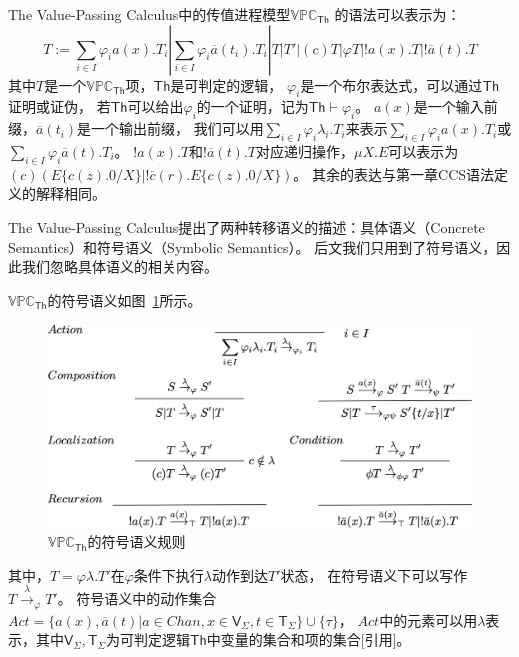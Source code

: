The Value-Passing Calculus中的传值进程模型$\mathbb{VPC}_{\mathsf{Th}}$
的语法可以表示为：
\begin{equation}\label{eq:vpc}
   T:=\sum_{i\in I}\varphi_i a(x).T_i|\sum_{i\in I}\varphi_i\overline{a}(t_i).T_i|T|T'|(c)T|\varphi T|!a(x).T|!\overline{a}(t).T
\end{equation}
其中$T$是一个$\mathbb{VPC}_{\mathsf{Th}}$项，$\mathsf{Th}$是可判定的逻辑，
$\varphi_i$是一个布尔表达式，可以通过$\mathsf{Th}$证明或证伪，
若$\mathsf{Th}$可以给出$\varphi_i$的一个证明，记为$\mathsf{Th}\vdash \varphi_i$。
$a(x)$是一个输入前缀，$\overline{a}(t_i)$是一个输出前缀，
我们可以用$\sum_{i\in I}\varphi_i\lambda_i.T_i$来表示$\sum_{i\in I}\varphi_i a(x).T_i$或$\sum_{i\in I}\varphi_i \overline{a}(t).T_i$。
$!a(x).T$和$!\overline{a}(t).T$对应递归操作，$\mu X.E$可以表示为
$(c)(E\{c(z).0/X\}|!\overline{c}(r).E\{c(z).0/X\})$。
其余的表达与第一章CCS语法定义的解释相同。

The Value-Passing Calculus提出了两种转移语义的描述：具体语义（Concrete Semantics）和符号语义（Symbolic Semantics）。
后文我们只用到了符号语义，因此我们忽略具体语义的相关内容。

$\mathbb{VPC}_{\mathsf{Th}}$的符号语义如图~\ref{fig_vpc}所示。

\begin{figure}[!htbp]
   \small
   \centering
   \includegraphics[width=13cm]{../figure/vpc.png}
    \caption[]{$\mathbb{VPC}_{\mathsf{Th}}$的符号语义规则}
    \label{fig_vpc}
\end{figure}
其中，$T=\varphi \lambda.T'$在$\varphi$条件下执行$\lambda$动作到达$T'$状态，
在符号语义下可以写作$T\stackrel{\lambda}{\rightarrow}_{\varphi}T'$。
符号语义中的动作集合$Act=\{a(x),\overline{a}(t)| a\in Chan, x\in \mathsf{V}_{\Sigma}, t\in \mathsf{T}_{\Sigma}\}\cup \{\tau\}$，
$Act$中的元素可以用$\lambda$表示，其中$\mathsf{V}_{\Sigma},\mathsf{T}_{\Sigma}$为可判定逻辑$\mathsf{Th}$中变量的集合和项的集合[引用]。

